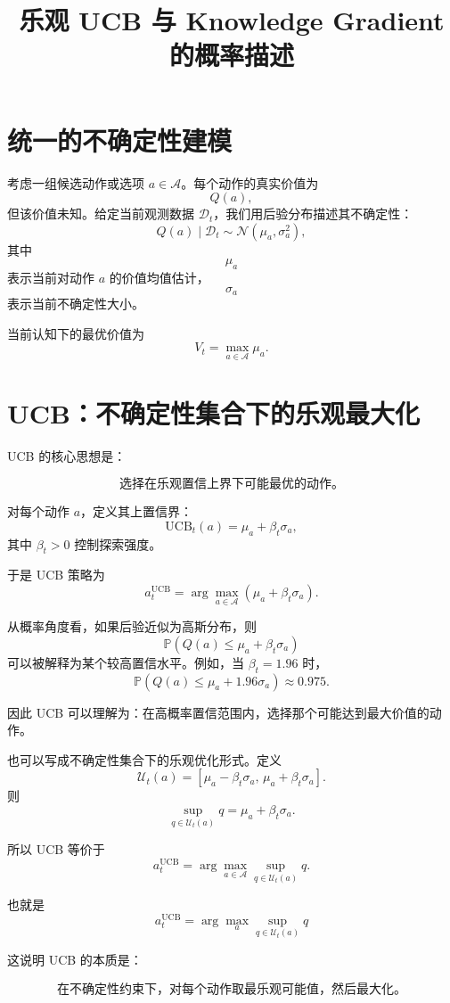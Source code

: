 \documentclass[UTF8,12pt]{ctexart}
\title{乐观 UCB 与 Knowledge Gradient 的概率描述}
\author{}
\date{}
\begin{document}
\maketitle

\section{统一的不确定性建模}

考虑一组候选动作或选项 $a\in\mathcal A$。每个动作的真实价值为
\[
Q(a),
\]
但该价值未知。给定当前观测数据 $\mathcal D_t$，我们用后验分布描述其不确定性：
\[
Q(a)\mid \mathcal D_t \sim \mathcal N(\mu_a,\sigma_a^2),
\]
其中
\[
\mu_a
\]
表示当前对动作 $a$ 的价值均值估计，
\[
\sigma_a
\]
表示当前不确定性大小。

当前认知下的最优价值为
\[
V_t = \max_{a\in\mathcal A}\mu_a.
\]

\section{UCB：不确定性集合下的乐观最大化}

UCB 的核心思想是：

\[
\boxed{
\text{选择在乐观置信上界下可能最优的动作。}
}
\]

对每个动作 $a$，定义其上置信界：
\[
\mathrm{UCB}_t(a)
=
\mu_a+\beta_t\sigma_a,
\]
其中 $\beta_t>0$ 控制探索强度。

于是 UCB 策略为
\[
a_t^{\mathrm{UCB}}
=
\arg\max_{a\in\mathcal A}
\left(
\mu_a+\beta_t\sigma_a
\right).
\]

从概率角度看，如果后验近似为高斯分布，则
\[
\mathbb P
\left(
Q(a)\leq \mu_a+\beta_t\sigma_a
\right)
\]
可以被解释为某个较高置信水平。例如，当 $\beta_t=1.96$ 时，
\[
\mathbb P
\left(
Q(a)\leq \mu_a+1.96\sigma_a
\right)
\approx 0.975.
\]

因此 UCB 可以理解为：在高概率置信范围内，选择那个可能达到最大价值的动作。

也可以写成不确定性集合下的乐观优化形式。定义
\[
\mathcal U_t(a)
=
\left[
\mu_a-\beta_t\sigma_a,\,
\mu_a+\beta_t\sigma_a
\right].
\]
则
\[
\sup_{q\in\mathcal U_t(a)}q
=
\mu_a+\beta_t\sigma_a.
\]

所以 UCB 等价于
\[
a_t^{\mathrm{UCB}}
=
\arg\max_{a\in\mathcal A}
\sup_{q\in\mathcal U_t(a)}
q.
\]

也就是
\[
\boxed{
a_t^{\mathrm{UCB}}
=
\arg\max_{a}
\sup_{q\in\mathcal U_t(a)}
q
}
\]

这说明 UCB 的本质是：

\[
\boxed{
\text{在不确定性约束下，对每个动作取最乐观可能值，然后最大化。}
}
\]
\end{document}

